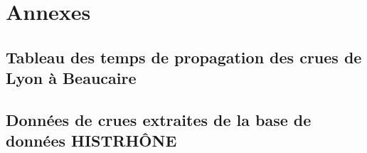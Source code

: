\chapter*{Annexes}
\label{chap:annexes}
	\section*{Tableau des temps de propagation des crues de Lyon à Beaucaire}
	\label{sec:TabPropag}
	
	
	\section*{Données de crues extraites de la base de données HISTRHÔNE}
	\label{sec:TabC4}